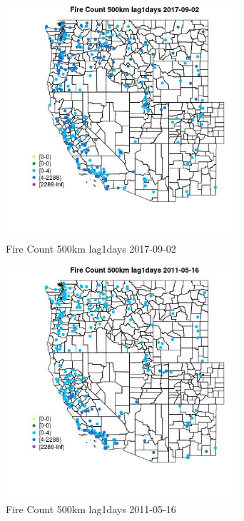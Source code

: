 \begin{figure} 
\centering  
\includegraphics[width=0.77\textwidth]{Code_Outputs/Report_ML_input_PM25_Step4_part_e_de_duplicated_aves_compiled_2019-05-20wNAs_MapObsFire_Count_500km_lag1days2017-09-02.jpg} 
\caption{\label{fig:Report_ML_input_PM25_Step4_part_e_de_duplicated_aves_compiled_2019-05-20wNAsMapObsFire_Count_500km_lag1days2017-09-02}Fire Count 500km lag1days 2017-09-02} 
\end{figure} 
 

\begin{figure} 
\centering  
\includegraphics[width=0.77\textwidth]{Code_Outputs/Report_ML_input_PM25_Step4_part_e_de_duplicated_aves_compiled_2019-05-20wNAs_MapObsFire_Count_500km_lag1days2011-05-16.jpg} 
\caption{\label{fig:Report_ML_input_PM25_Step4_part_e_de_duplicated_aves_compiled_2019-05-20wNAsMapObsFire_Count_500km_lag1days2011-05-16}Fire Count 500km lag1days 2011-05-16} 
\end{figure} 
 

